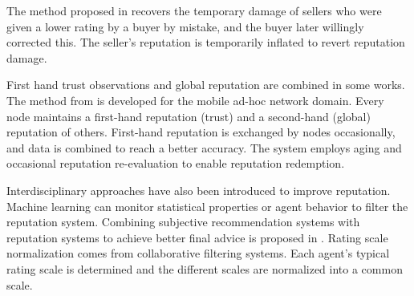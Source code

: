 \documentclass[%
    ]{\PathToTumTemplate/thesis/tum_thesis}
\begin{document}
The method proposed in \cite{liu_reputation_2015} recovers the temporary damage of sellers who were given a lower rating by a buyer by mistake, and the buyer later willingly corrected this.
The seller's reputation is temporarily inflated to revert reputation damage.

First hand trust observations and global reputation are combined in some works\cite{boudec_robust_2003,huynh_handling_2005}.
The method from \cite{boudec_robust_2003} is developed for the mobile ad-hoc network domain.
Every node maintains a first-hand reputation (trust) and a second-hand (global) reputation of others.
First-hand reputation is exchanged by nodes occasionally, and data is combined to reach a better accuracy.
The system employs aging and occasional reputation re-evaluation to enable reputation redemption.

Interdisciplinary approaches have also been introduced to improve reputation.
Machine learning can monitor statistical properties or agent behavior to filter the reputation system\cite{khoshkbarchi_coping_2017,wang_bayesian_2003,yazidi_solving_2017}.
Combining subjective recommendation systems with reputation systems to achieve better final advice is proposed in \cite{hutchison_combining_2013}.
Rating scale normalization comes from collaborative filtering systems\cite{margaris_improving_2017,margaris_improving_2018}.
Each agent's typical rating scale is determined and the different scales are normalized into a common scale.





\end{document}
